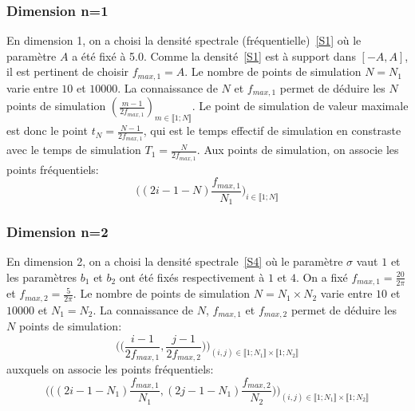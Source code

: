 \subsubsection{Dimension n=1}
En dimension 1, on a choisi la densité spectrale (fréquentielle)~\eqref{S1} où le paramètre $A$ a été
fixé à 5.0. Comme la densité~\eqref{S1} est à support dans $[-A,A]$, il est pertinent de choisir $f_{max,1} = A$.
Le nombre de points de simulation $N = N_1$ varie entre $10$ et $10000$. La connaissance de $N$ et $f_{max,1}$ permet
de déduire les $N$ points de simulation $(\frac{m-1}{2f_{max,1}})_{m \in \llbracket 1;N \rrbracket}$. Le point de simulation de valeur maximale est
donc le point $t_{N} = \frac{N-1}{2f_{max,1}}$, qui est le temps effectif de simulation en constraste avec le temps de simulation
$T_1 = \frac{N}{2f_{max,1}}$. Aux points de simulation, on associe les points fréquentiels:
\begin{equation*} \biggl((2i -1 - N) \frac{f_{max,1}}{N_1}\biggr)_{i \in \llbracket 1;N \rrbracket} \end{equation*}

\subsubsection{Dimension n=2}
En dimension 2, on a choisi la densité spectrale~\eqref{S4} où le paramètre $\sigma$ vaut $1$ et les paramètres $b_1$ et $b_2$ ont été
fixés respectivement à $1$ et $4$. On a fixé $f_{max,1} = \frac{20}{2\pi}$ et  $f_{max,2} = \frac{5}{2\pi}$.
Le nombre de points de simulation $N = N_1 \times N_2$ varie entre $10$ et $10000$ et $N_1 = N_2$. La connaissance de $N$, $f_{max,1}$ et $f_{max,2}$  permet
de déduire les $N$ points de simulation: \begin{equation*} \biggl(\biggl(\frac{i-1}{2f_{max,1}},\frac{j-1}{2f_{max,2}}\biggr)\biggr)_{(i,j) \in \llbracket 1;N_1 \rrbracket \times \llbracket 1;N_2 \rrbracket } \end{equation*}
auxquels on associe les points fréquentiels:
\begin{equation*} \biggl(\biggl((2i -1 - N_1) \frac{f_{max,1}}{N_1}, (2j -1 - N_1) \frac{f_{max,2}}{N_2}\biggr)\biggr)_{(i,j) \in \llbracket 1;N_1 \rrbracket \times \llbracket 1;N_2 \rrbracket } \end{equation*}

